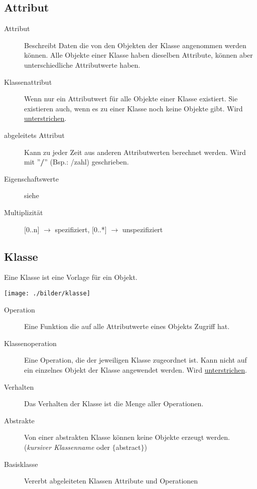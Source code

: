 \subsection{Attribut }
  \begin{description}
    \item[Attribut] 
      Beschreibt Daten die von den Objekten der Klasse angenommen
      werden können. Alle Objekte einer Klasse haben dieselben Attribute, können
      aber unterschiedliche Attributwerte haben.
    \item[Klassenattribut] 
      Wenn nur ein Attributwert für alle Objekte einer Klasse existiert. 
      Sie existieren auch, wenn es zu einer Klasse noch keine Objekte gibt.
      Wird \underline{unterstrichen}.
    \item[abgeleitets Attribut]
      Kann zu jeder Zeit aus anderen Attributwerten berechnet werden. Wird mit ''\textbf{/}'' (Bsp.: /zahl) geschrieben.  
    \item[Eigenschaftswerte]
      siehe       
    \item[Multiplizität]
      [0..n] $\rightarrow$ spezifiziert, [0..*] $\rightarrow$ unspezifiziert
  \end{description}
  
\subsection{Klasse }
  Eine Klasse ist eine Vorlage für ein Objekt.\\
 \begin{minipage}[t]{4cm}\texttt{[image: ./bilder/klasse]}\end{minipage}
 \begin{minipage}{15cm}
   \begin{description}
    \item[Operation] 
      Eine Funktion die auf alle Attributwerte eines Objekts Zugriff hat.
    \item[Klassenoperation] 
      Eine Operation, die der jeweiligen Klasse zugeordnet ist. 
      Kann nicht auf 
      ein einzelnes Objekt der Klasse angewendet werden. Wird \underline{unterstrichen}.
    \item[Verhalten] 
      Das Verhalten der Klasse ist die Menge aller Operationen.
    \item[Abstrakte] 
      Von einer abstrakten Klasse können keine Objekte erzeugt werden. 
      (\textit{kursiver Klassenname} oder $\lbrace$abstract$\rbrace$)
    \item[Basisklasse] 
      Vererbt abgeleiteten Klassen Attribute und Operationen
  \end{description}
  \end{minipage}
  
